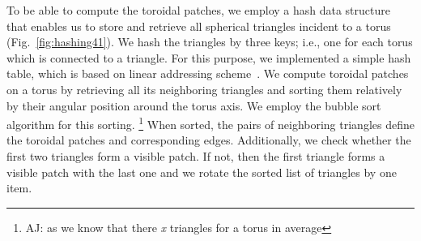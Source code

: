 


To be able to compute the toroidal patches, we employ a hash data structure that enables us to store and retrieve all spherical triangles incident to a torus (Fig.~\ref{fig:hashing41}). 
We hash the triangles by three keys; i.e., one for each torus which is connected to a triangle.
For this purpose, we implemented a simple hash table, which is based on linear addressing scheme~\cite{alcantara2011efficient}.
We compute toroidal patches on a torus by retrieving all its neighboring triangles and sorting them relatively by their angular position around the torus axis. 
We employ the bubble sort algorithm for this sorting.
\footnote{AJ: as we know that there \textit{x} triangles for a torus in average}
When sorted, the pairs of neighboring triangles define the toroidal patches and corresponding edges.
Additionally, we check whether the first two triangles form a visible patch.
If not, then the first triangle forms a visible patch with the last one and we rotate the sorted list of triangles by one item.

